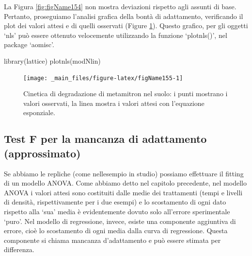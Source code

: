 \documentclass[a4paper,12pt,oneside]{book}
\newenvironment{Shaded}{}{}
\newcommand{\KeywordTok}[1]{#1}
\newcommand{\NormalTok}[1]{#1}
\begin{document}
La Figura \ref{fig:figName154} non mostra deviazioni rispetto agli assunti di base. Pertanto, proseguiamo l'analisi grafica della bontà di adattamento, verificando il plot dei valori attesi e di quelli osservati (Figure \ref{fig:figName155}). Questo grafico, per gli oggetti `nls' può essere ottenuto velocemente utilizzando la funzione `plotnls()', nel package `aomisc'.

\begin{Shaded}
\begin{Highlighting}[]
\KeywordTok{library}\NormalTok{(lattice)}
\KeywordTok{plotnls}\NormalTok{(modNlin)}
\end{Highlighting}
\end{Shaded}

\begin{figure}

{\centering \texttt{[image: \_main\_files/figure-latex/figName155-1]} 

}

\caption{Cinetica di degradazione di metamitron nel suolo: i punti mostrano i valori osservati, la linea mostra i valori attesi con l'equazione esponziale.}\label{fig:figName155}
\end{figure}

\hypertarget{test-f-per-la-mancanza-di-adattamento-approssimato}{%
\subsection{Test F per la mancanza di adattamento (approssimato)}\label{test-f-per-la-mancanza-di-adattamento-approssimato}}

Se abbiamo le repliche (come nellesempio in studio) possiamo effettuare il fitting di un modello ANOVA. Come abbiamo detto nel capitolo precedente, nel modello ANOVA i valori attesi sono costituiti dalle medie dei trattamenti (tempi e livelli di densità, rispettivamente per i due esempi) e lo scostamento di ogni dato rispetto alla `sua' media è evidentemente dovuto solo all'errore sperimentale `puro'. Nel modello di regressione, invece, esiste una componente aggiuntiva di errore, cioè lo scostamento di ogni media dalla curva di regressione. Questa componente si chiama mancanza d'adattamento e può essere stimata per differenza.
\end{document}
